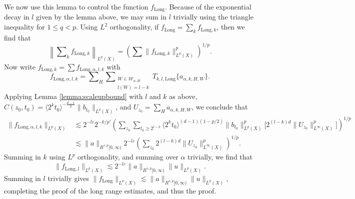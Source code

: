 We now use this lemma to control the function $f_{\text{Long}}$. Because of the exponential decay in $l$ given by the lemma above, we may sum in $l$ trivially using the triangle inequality for $1 \leq q < p$. Using $L^2$ orthogonality, if $f_{\text{Long}} = \sum_k f_{\text{Long},k}$, then we find that
%
\[ \left\| \sum\nolimits_k f_{\text{Long},k} \right\|_{L^p(X)} = \left( \sum \| f_{\text{Long},k} \|_{L^p(X)}^p \right)^{1/p}. \]
%
Now write $f_{\text{Long},k} = \sum f_{\text{Long},\alpha,l,k}$ with
%
\[ f_{\text{Long},\alpha,l,k} = \sum\nolimits_H \sum\nolimits_{\substack{W \in \mathcal{W}_{\alpha,H}\\l(W) = l - k}} T_{k,l,\text{Long}} \{ a_{\alpha,k,H,W} \}. \]
%
Applying Lemma \ref{lemma:scaleupbound} with $l$ and $k$ as above, $C(z_0,t_0) = \langle 2^k t_0 \rangle^{- \frac{d-1}{2}} \| b_{t_0} \|_{L^q(X)}$, and $U_{z_0} = \sum\nolimits_H a_{\alpha,k,H,W}$, we conclude that %
%
\begin{align*}
    \| f_{\text{Long},\alpha,l,k} \|_{L^p(X)} &\lesssim 2^{-l \varepsilon} 2^{-k/p'} \left( \sum\nolimits_{z_0} \sum\nolimits_{t_0 \geq 2^{l-k}} \langle 2^k t_0 \rangle^{(d-1)(1 - p/2)} \| b_{t_0} \|_{L^p(X)}^p \big[ 2^{(l-k)d} \| U_{z_0} \|_{L^\infty(X)}^p \big] \right)^{1/p}\\
    &\lesssim \| a \|_{R^{s,p}[0,\infty)} 2^{-l \varepsilon} \left( \sum\nolimits_{z_0} 2^{(l-k)d} \| U_{z_0} \|_{L^\infty(X)}^p \right)^{1/p}.
\end{align*}
%
Summing in $k$ using $L^p$ orthogonality, and summing over $\alpha$ trivially, we find that
%
\[ \| f_{\text{Long},l} \|_{L^p(X)} \lesssim 2^{-l \varepsilon}  \| a \|_{R^{s,p}[0,\infty)} \| u \|_{L^p(X)}. \]
%
Summing in $l$ trivially gives $\| f_{\text{Long}} \|_{L^p(X)} \lesssim \| a \|_{R^{s,p}[0,\infty)} \| u \|_{L^p(X)}$, completing the proof of the long range estimates, and thus the proof.